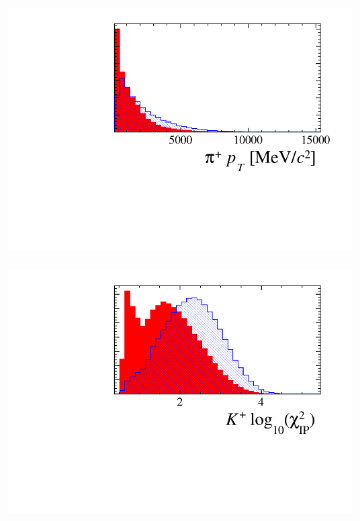 \begin{figure}[!h]
\begin{subfigure}[t]{0.22\textwidth}
   \end{subfigure}
   \begin{subfigure}[t]{0.22\textwidth}
      \centering
      \includegraphics[width=1.0\textwidth]{figs/Selection/Ds_BDT_Var_Ds2KKPi_D_P_PT.pdf}
   \end{subfigure}
   \begin{subfigure}[t]{0.22\textwidth}
      \centering
      \includegraphics[width=1.0\textwidth]{figs/Selection/Ds_BDT_Var_Ds2KKPi_log10_D_K0_IPCHI2_OWNPV.pdf}
   \end{subfigure}
   \begin{subfigure}[t]{0.22\textwidth}
      \centering

\end{subfigure}
\end{figure}
